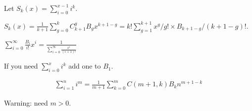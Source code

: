 Let $S_k(x)=\sum_{i=0}^{x-1}i^k$.\par
$S_k(x)=\frac{1}{k+1}\sum_{g=0}^k C_{k+1}^g B_g x^{k+1-g}=k!\sum_{g=1}^{k+1} x^g/g! \times B_{k+1-g}/(k+1-g)!$.\par
$\sum_{i=0}^{\infty} \frac{B_i}{i!}x^i=\frac{1}{\sum_{i=0}^{\infty}\frac{x^i}{(i+1)!}}$\par
If you need $\sum_{i=0}^x i^k$ add one to $B_1$.\par
\begin{eqnarray*}
\sum_{i=1}^n i^m=\frac{1}{m+1}\sum_{k=0}^mC(m+1,k)B_kn^{m+1-k}
\end{eqnarray*}\par
Warning: need $m>0$.